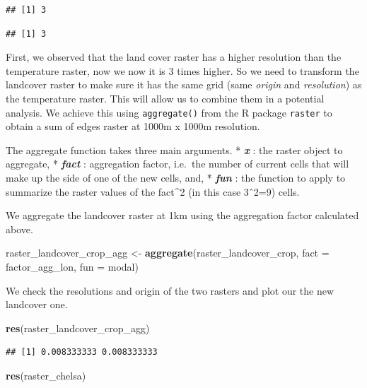 \documentclass[
]{book}
\newenvironment{Shaded}{\begin{snugshade}}{\end{snugshade}}
\newcommand{\DataTypeTok}[1]{\textcolor[rgb]{0.13,0.29,0.53}{#1}}
\newcommand{\KeywordTok}[1]{\textcolor[rgb]{0.13,0.29,0.53}{\textbf{#1}}}
\newcommand{\NormalTok}[1]{#1}
\newcommand{\StringTok}[1]{\textcolor[rgb]{0.31,0.60,0.02}{#1}}
\begin{document}
\begin{verbatim}
## [1] 3
\end{verbatim}

\begin{verbatim}
## [1] 3
\end{verbatim}

First, we observed that the land cover raster has a higher resolution than the temperature raster, now we now it is 3 times higher. So we need to transform the landcover raster to make sure it has the same grid (same \emph{origin} and \emph{resolution}) as the temperature raster. This will allow us to combine them in a potential analysis. We achieve this using \texttt{aggregate()} from the R package \texttt{raster} to obtain a sum of edges raster at 1000m x 1000m resolution.

The aggregate function takes three main arguments.
* \textbf{\emph{x}} : the raster object to aggregate,
* \textbf{\emph{fact}} : aggregation factor, i.e.~the number of current cells that will make up the side of one of the new cells, and,
* \textbf{\emph{fun}} : the function to apply to summarize the raster values of the fact\^{}2 (in this case 3ˆ2=9) cells.

We aggregate the landcover raster at 1km using the aggregation factor calculated above.

\begin{Shaded}
\begin{Highlighting}[]
\NormalTok{raster_landcover_crop_agg <-}\StringTok{ }\KeywordTok{aggregate}\NormalTok{(raster_landcover_crop, }\DataTypeTok{fact =}\NormalTok{ factor_agg_lon, }\DataTypeTok{fun =}\NormalTok{ modal)}
\end{Highlighting}
\end{Shaded}

We check the resolutions and origin of the two rasters and plot our the new landcover one.

\begin{Shaded}
\begin{Highlighting}[]
\KeywordTok{res}\NormalTok{(raster_landcover_crop_agg)}
\end{Highlighting}
\end{Shaded}

\begin{verbatim}
## [1] 0.008333333 0.008333333
\end{verbatim}

\begin{Shaded}
\begin{Highlighting}[]
\KeywordTok{res}\NormalTok{(raster_chelsa)}
\end{Highlighting}
\end{Shaded}
\end{document}
